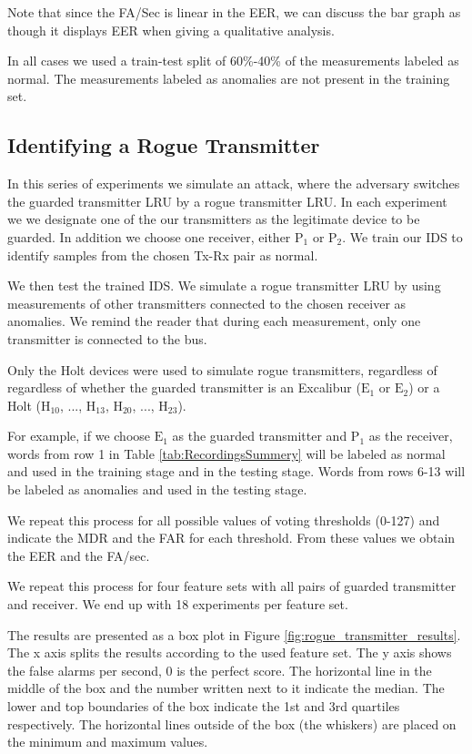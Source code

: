 \documentclass[conference]{IEEEtran}
\begin{document}
  Note that since the FA/Sec is linear in the EER, we can discuss the bar graph as though it displays EER when giving a qualitative analysis.
  
  In all cases we used a train-test split of 60\%-40\% of the measurements labeled as normal. The measurements labeled as anomalies are not present in the training set.
  
\subsection{Identifying a Rogue Transmitter}
  In this series of experiments we simulate an attack, where the adversary switches the guarded transmitter LRU by a rogue transmitter LRU. In each experiment we we designate one of the our transmitters as the legitimate device to be guarded. In addition we choose one receiver, either \(\text{P}_1\) or \(\text{P}_2\).  We train our IDS to identify samples from the chosen Tx-Rx pair as normal.
  
  We then test the trained IDS. We simulate a rogue transmitter LRU by using measurements of other transmitters connected to the chosen receiver as anomalies. We remind the reader that during each measurement, only one transmitter is connected to the bus.
  
  Only the Holt devices were used to simulate rogue transmitters, regardless of regardless of whether the guarded transmitter is an Excalibur (\(\text{E}_1\) or \(\text{E}_2\)) or a Holt (\(\text{H}_{10}\), ..., \(\text{H}_{13}\), \(\text{H}_{20}\), ..., \(\text{H}_{23}\)).
  
  For example, if we choose \(\text{E}_1\) as the guarded transmitter and \(\text{P}_1\) as the receiver, words from row 1 in Table \ref{tab:RecordingsSummery} will be labeled as normal and used in the training stage and in the testing stage. Words from rows 6-13 will be labeled as anomalies and used in the testing stage.
  
  We repeat this process for all possible values of voting thresholds (0-127) and indicate the MDR and the FAR for each threshold. From these values we obtain the EER and the FA/sec.
  
  We repeat this process for four feature sets with all pairs of guarded transmitter and receiver. We end up with 18 experiments per feature set.
  
  The results are presented as a box plot in Figure \ref{fig:rogue_transmitter_results}. The x axis splits the results according to the used feature set. The y axis shows the false alarms per second, 0 is the perfect score. The horizontal line in the middle of the box and the number written next to it indicate the median. The lower and top boundaries of the box indicate the 1st and 3rd quartiles respectively. The horizontal lines outside of the box (the whiskers) are placed on the minimum and maximum values.
  
\end{document}
